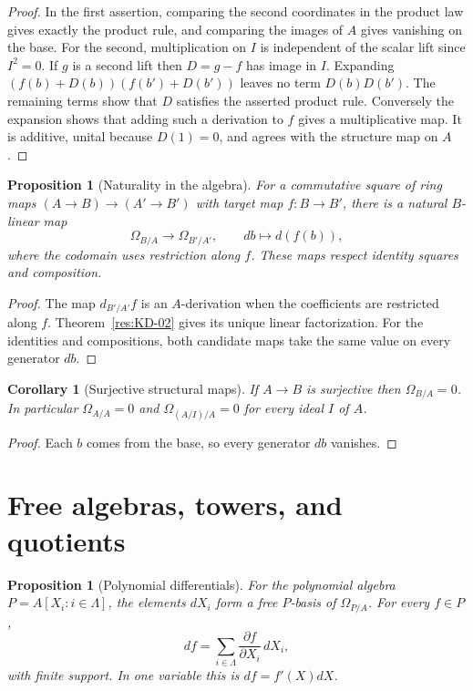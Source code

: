 \documentclass[11pt,oneside,openany]{book}
\newtheorem{proposition}[theorem]{Proposition}
\newtheorem{corollary}[theorem]{Corollary}
\theoremstyle{definition}
\theoremstyle{remark}
\begin{document}
\begin{proof}
In the first assertion, comparing the second coordinates in the product law gives exactly the product rule, and comparing the images of $A$ gives vanishing on the base. For the second, multiplication on $I$ is independent of the scalar lift since $I^2=0$. If $g$ is a second lift then $D=g-f$ has image in $I$. Expanding $(f(b)+D(b))(f(b')+D(b'))$ leaves no term $D(b)D(b')$. The remaining terms show that $D$ satisfies the asserted product rule. Conversely the expansion shows that adding such a derivation to $f$ gives a multiplicative map. It is additive, unital because $D(1)=0$, and agrees with the structure map on $A$.
\end{proof}

\begin{proposition}[Naturality in the algebra]\label{res:KD-05}
For a commutative square of ring maps $(A\to B)\to(A'\to B')$ with target map $f:B\to B'$, there is a natural $B$-linear map
\[
 \Omega_{B/A}\longrightarrow\Omega_{B'/A'},\qquad db\longmapsto d(f(b)),
\]
where the codomain uses restriction along $f$. These maps respect identity squares and composition.
\end{proposition}

\begin{proof}
The map $d_{B'/A'} f$ is an $A$-derivation when the coefficients are restricted along $f$. Theorem~\ref{res:KD-02} gives its unique linear factorization. For the identities and compositions, both candidate maps take the same value on every generator $db$.
\end{proof}

\begin{corollary}[Surjective structural maps]\label{res:KD-06}
If $A\to B$ is surjective then $\Omega_{B/A}=0$. In particular $\Omega_{A/A}=0$ and $\Omega_{(A/I)/A}=0$ for every ideal $I$ of $A$.
\end{corollary}

\begin{proof}
Each $b$ comes from the base, so every generator $db$ vanishes.
\end{proof}

\section{Free algebras, towers, and quotients}

\begin{proposition}[Polynomial differentials]\label{res:KD-07}
For the polynomial algebra $P=A[X_i:i\in\Lambda]$, the elements $dX_i$ form a free $P$-basis of $\Omega_{P/A}$. For every $f\in P$,
\[
 df=\sum_{i\in\Lambda} \frac{\partial f}{\partial X_i}\,dX_i,
\]
with finite support. In one variable this is $df=f'(X)dX$.
\end{proposition}
\end{document}
